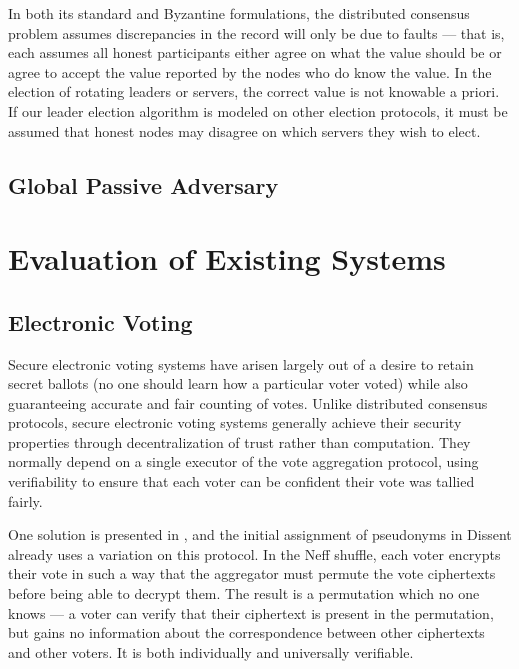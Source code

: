     In both its standard and Byzantine formulations, the distributed consensus
    problem assumes discrepancies in the record will only be due to faults ---
    that is, each assumes all honest participants either agree on what the value
    should be or agree to accept the value reported by the nodes who do know the
    value.  In the election of rotating leaders or servers, the correct value is
    not knowable a priori. If our leader election algorithm is modeled on other
    election protocols, it must be assumed that honest nodes may disagree on
    which servers they wish to elect.
  \subsection{Global Passive Adversary}
\section{Evaluation of Existing Systems}
\subsection{Electronic Voting} \label{Subsection:evoting}
  Secure electronic voting systems have arisen largely out of a desire to
  retain secret ballots (no one should learn how a particular voter voted)
  while also guaranteeing accurate and fair counting of votes. Unlike
  distributed consensus protocols, secure electronic voting systems generally
  achieve their security properties through decentralization of trust rather
  than computation. They normally depend on a single executor of the vote
  aggregation protocol, using verifiability to ensure that each voter can be
  confident their vote was tallied fairly.

    One solution is presented in \cite{neff},
    and the initial assignment of pseudonyms in Dissent already uses a variation
    on this protocol. In the Neff shuffle, each voter encrypts their vote in
    such a way that the aggregator must permute the vote ciphertexts before
    being able to decrypt them. The result is a permutation which no one knows
    --- a voter can verify that their ciphertext is present in the permutation,
    but gains no information about the correspondence between other ciphertexts
    and other voters. It is both individually and universally verifiable.

